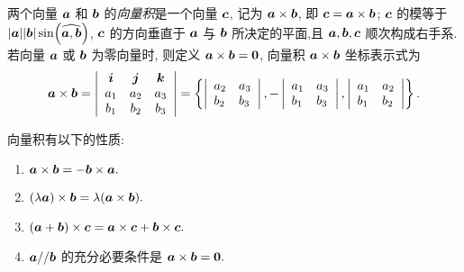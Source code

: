 \begin{definition}
    两个向量 $ \vb*{a} $ 和 $ \vb*{b} $ 的\textit{向量积}是一个向量 $ \vb*{c} $, 记为 $ \vb*{a} \times \vb*{b} $, 
    即 $ \vb*{c}=\vb*{a} \times \vb*{b}$; $\vb*{c} $ 的模等于 $ |\vb*{a}||\vb*{b}| \sin (\widehat{\vb*{a}, \vb*{b}})$, $\vb*{c} $ 的方向垂直于 $ \vb*{a} $ 与 $ \vb*{b} $ 所决定的平面,且 $ \vb*{a}, \vb*{b}, \vb*{c} $ 顺次构成右手系.
    若向量 $ \vb*{a} $ 或 $ \vb*{b} $ 为零向量时, 则定义 $ \vb*{a} \times \vb*{b}=\mathbf{0} $, 向量积 $ \vb*{a} \times \vb*{b} $ 坐标表示式为
    $$
        \vb*{a} \times \vb*{b}=\left|\begin{array}{ccc}
            \vb*{i} & \vb*{j} & \vb*{k} \\
            a_{1}   & a_{2}   & a_{3}   \\
            b_{1}   & b_{2}   & b_{3}
        \end{array}\right|=\left\{\left|\begin{array}{ll}
            a_{2} & a_{3} \\
            b_{2} & b_{3}
        \end{array}\right|,-\left|\begin{array}{ll}
            a_{1} & a_{3} \\
            b_{1} & b_{3}
        \end{array}\right|,\left|\begin{array}{ll}
            a_{1} & a_{2} \\
            b_{1} & b_{2}
        \end{array}\right|\right\} .
    $$
\end{definition}

向量积有以下的性质:
\begin{enumerate}[label=(\arabic{*})]
    \item $\vb*{a} \times \vb*{b}=-\vb*{b} \times \vb*{a} .$
    \item $(\lambda \vb*{a}) \times \vb*{b}=\lambda(\vb*{a} \times \vb*{b}) .$
    \item $(\vb*{a}+\vb*{b}) \times \vb*{c}=\vb*{a} \times \vb*{c}+\vb*{b} \times \vb*{c} .$
    \item $\vb*{a} / / \vb*{b} $ 的充分必要条件是 $ \vb*{a} \times \vb*{b}=\mathbf{0} .$
\end{enumerate}


